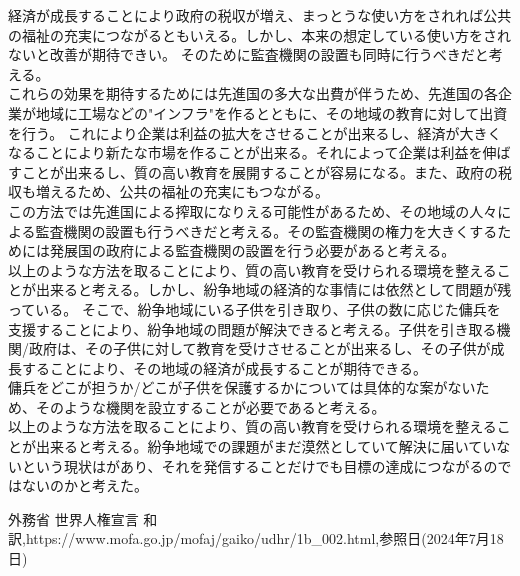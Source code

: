 \documentclass[a4paper,11pt]{jsarticle}
\begin{document}
経済が成長することにより政府の税収が増え、まっとうな使い方をされれば公共の福祉の充実につながるともいえる。しかし、本来の想定している使い方をされないと改善が期待できい。
そのために監査機関の設置も同時に行うべきだと考える。\\
これらの効果を期待するためには先進国の多大な出費が伴うため、先進国の各企業が地域に工場などの"インフラ"を作るとともに、その地域の教育に対して出資を行う。
これにより企業は利益の拡大をさせることが出来るし、経済が大きくなることにより新たな市場を作ることが出来る。それによって企業は利益を伸ばすことが出来るし、質の高い教育を展開することが容易になる。また、政府の税収も増えるため、公共の福祉の充実にもつながる。\\
この方法では先進国による搾取になりえる可能性があるため、その地域の人々による監査機関の設置も行うべきだと考える。その監査機関の権力を大きくするためには発展国の政府による監査機関の設置を行う必要があると考える。\\
以上のような方法を取ることにより、質の高い教育を受けられる環境を整えることが出来ると考える。しかし、紛争地域の経済的な事情には依然として問題が残っている。
そこで、紛争地域にいる子供を引き取り、子供の数に応じた傭兵を支援することにより、紛争地域の問題が解決できると考える。子供を引き取る機関/政府は、その子供に対して教育を受けさせることが出来るし、その子供が成長することにより、その地域の経済が成長することが期待できる。\\
傭兵をどこが担うか/どこが子供を保護するかについては具体的な案がないため、そのような機関を設立することが必要であると考える。\\
以上のような方法を取ることにより、質の高い教育を受けられる環境を整えることが出来ると考える。紛争地域での課題がまだ漠然としていて解決に届いていないという現状はがあり、それを発信することだけでも目標の達成につながるのではないのかと考えた。\\

\begin{thebibliography}{99}
   外務省 世界人権宣言 和訳,https://www.mofa.go.jp/mofaj/gaiko/udhr/1b\_002.html,参照日(2024年7月18日)
\end{thebibliography}  
\end{document}
